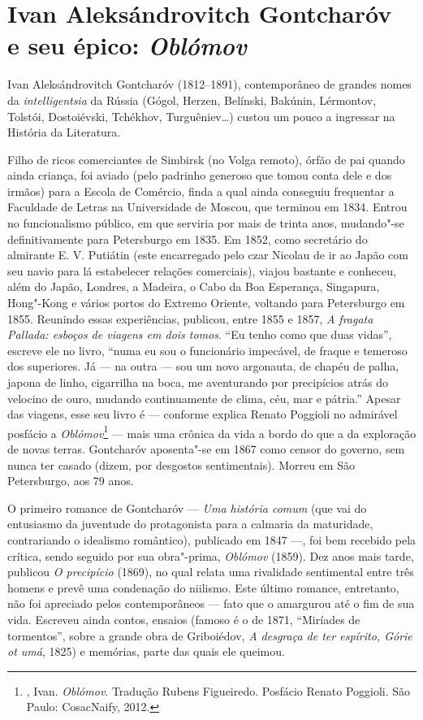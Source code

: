 \chapter{Ivan Aleksándrovitch Gontcharóv\\ e seu épico: \emph{Oblómov}}
\label{oblomov}

Ivan Aleksándrovitch Gontcharóv (1812--1891), contemporâneo de grandes
nomes da \emph{intelligentsia} da Rússia (Gógol, Herzen, Belínski,
Bakúnin, Lérmontov, Tolstói, Dostoiévski, Tchékhov,
Turguêniev\ldots{}) custou um pouco a ingressar na História da
Literatura. 

Filho de ricos comerciantes de Simbirsk (no Volga remoto), órfão de
pai quando ainda criança, foi aviado (pelo padrinho generoso que
tomou conta dele e dos irmãos) para a Escola de Comércio, finda a
qual ainda conseguiu frequentar a Faculdade de Letras na Universidade
de Moscou, que terminou em 1834. Entrou no funcionalismo público, em
que serviria por mais de trinta anos, mudando"-se definitivamente para
Petersburgo em 1835. Em 1852, como secretário do almirante E. V.
Putiátin (este encarregado pelo czar Nicolau  de ir ao
Japão com seu navio para lá estabelecer relações comerciais), viajou
bastante e conheceu, além do Japão, Londres, a Madeira, o Cabo da Boa
Esperança, Singapura, Hong"-Kong e vários portos do Extremo Oriente,
voltando para Petersburgo em 1855. Reunindo essas experiências,
publicou, entre 1855 e 1857, \emph{A fragata Pallada: esboços de
viagens em dois tomos}. ``Eu tenho como que duas vidas'', escreve
ele no livro, ``numa eu sou o funcionário impecável, de fraque e
temeroso dos superiores. Já --- na outra --- sou um novo argonauta,
de chapéu de palha, japona de linho, cigarrilha na boca, me
aventurando por precipícios atrás do velocino de ouro, mudando
continuamente de clima, céu, mar e pátria.'' Apesar das viagens,
esse seu livro é --- conforme explica Renato Poggioli no admirável
posfácio a \emph{Oblómov}\footnote{, Ivan.
\emph{Oblómov}. Tradução Rubens Figueiredo. Posfácio Renato Poggioli.
São Paulo: CosacNaify, 2012.} --- mais uma crônica da vida a bordo do
que a da exploração de novas terras. Gontcharóv aposenta"-se em 1867
como censor do governo, sem nunca ter casado (dizem, por desgostos
sentimentais). Morreu em São Petersburgo, aos 79 anos. 

O primeiro romance  de Gontcharóv --- \emph{Uma história comum} (que vai do entusiasmo da juventude do protagonista para a calmaria da maturidade, contrariando o idealismo romântico), publicado em 1847 ---, foi bem recebido pela crítica, sendo seguido por sua obra"-prima, \emph{Oblómov} (1859). Dez anos mais tarde, publicou \emph{O precipício} (1869), no qual relata uma rivalidade sentimental entre três homens e prevê uma condenação do niilismo. Este último romance, entretanto, não foi apreciado pelos contemporâneos --- fato que o amargurou até o fim de sua vida. Escreveu ainda contos, ensaios (famoso é o de 1871, ``Miríades de tormentos'', sobre a grande obra de Griboiédov, \emph{A desgraça de ter espírito, Górie ot umá}, 1825) e memórias, parte das quais ele queimou. 

